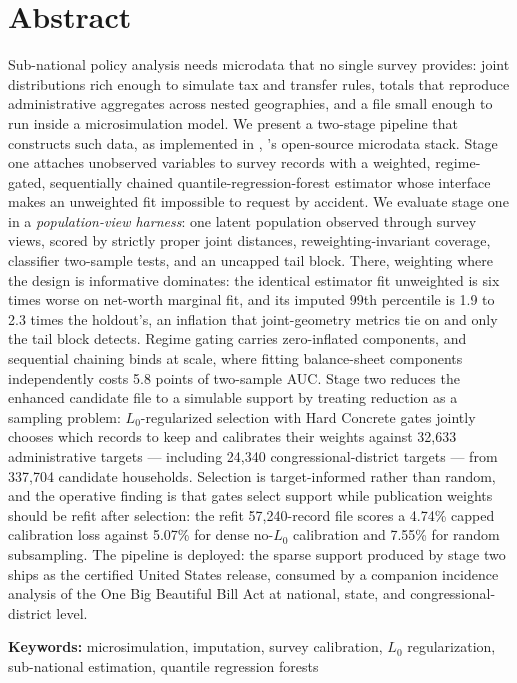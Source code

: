\section*{Abstract}

Sub-national policy analysis needs microdata that no single survey
provides: joint distributions rich enough to simulate tax and transfer
rules, totals that reproduce administrative aggregates across nested
geographies, and a file small enough to run inside a microsimulation
model. We present a two-stage pipeline that constructs such data, as
implemented in \populace{}, \policyengine{}'s open-source microdata stack. Stage one attaches unobserved variables to survey records
with a weighted, regime-gated, sequentially chained
quantile-regression-forest estimator whose interface makes an
unweighted fit impossible to request by accident. We evaluate stage one in a
\emph{population-view harness}: one latent population observed
through survey views, scored by strictly proper joint distances,
reweighting-invariant coverage, classifier two-sample tests, and an
uncapped tail block. There, weighting where the design is informative
dominates: the identical estimator fit unweighted is six times worse on
net-worth marginal fit, and its imputed 99th percentile is 1.9 to 2.3
times the holdout's, an inflation that joint-geometry metrics tie on
and only the tail block detects. Regime gating carries zero-inflated
components, and sequential chaining binds at scale, where fitting
balance-sheet components independently costs 5.8 points of two-sample
AUC. Stage two reduces the enhanced candidate file to a simulable
support by treating reduction as a sampling problem: $L_0$-regularized
selection with Hard Concrete gates jointly chooses which records to
keep and calibrates their weights against 32{,}633 administrative
targets --- including 24{,}340 congressional-district targets --- from
337{,}704 candidate households. Selection is target-informed rather
than random, and the operative finding is that gates select support
while publication weights should be refit after selection: the refit
57{,}240-record file scores a 4.74\% capped calibration loss against
5.07\% for dense no-$L_0$ calibration and 7.55\% for random
subsampling. The pipeline is deployed: the sparse support produced by
stage two ships as the certified \populace{} United States release,
consumed by a companion incidence analysis of the One Big Beautiful
Bill Act at national, state, and congressional-district level.

\vspace{1em}
\noindent\textbf{Keywords:} microsimulation, imputation, survey
calibration, $L_0$ regularization, sub-national estimation, quantile
regression forests
